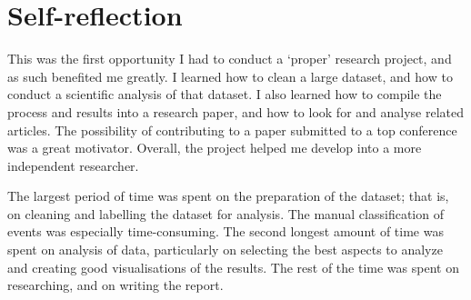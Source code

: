 \section{Self-reflection}
This was the first opportunity I had to conduct a `proper' research project, and as such benefited me greatly.
I learned how to clean a large dataset, and how to conduct a scientific analysis of that dataset.
I also learned how to compile the process and results into a research paper, and how to look for and analyse related articles.
The possibility of contributing to a paper submitted to a top conference was a great motivator.
Overall, the project helped me develop into a more independent researcher.

The largest period of time was spent on the preparation of the dataset; that is, on cleaning and labelling the dataset for analysis.
The manual classification of events was especially time-consuming.
The second longest amount of time was spent on analysis of data, particularly on selecting the best aspects to analyze and creating good visualisations of the results.
The rest of the time was spent on researching, and on writing the report.
